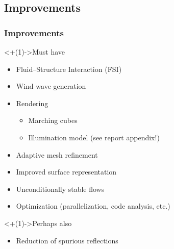 \subsection{Improvements}

\begin{frame}[<+(1)->]
\frametitle{Improvements}

\uncover<+(1)->{Must have}
\begin{itemize}
\item Fluid--Structure Interaction (FSI)
\item Wind wave generation
\item Rendering
\begin{itemize}
\item{Marching cubes}
\item{Illumination model (see report appendix!)}
\end{itemize}
\item Adaptive mesh refinement
\item Improved surface representation
\item Unconditionally stable flows
\item Optimization (parallelization, code analysis, etc.)
\end{itemize}

\uncover<+(1)->{Perhaps also}
\begin{itemize}
\item Reduction of spurious reflections
\end{itemize}

\end{frame}
